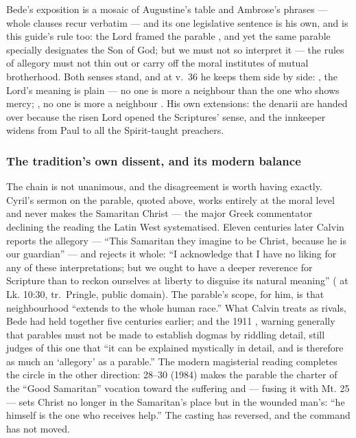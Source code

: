 \begin{witnessnote}
Bede's exposition is a mosaic of Augustine's table and Ambrose's phrases ---
whole clauses recur verbatim --- and its one legislative sentence is his own,
and is this guide's rule too: the Lord framed the parable , and yet the same parable
specially designates the Son of God; but we must not so interpret it
 --- the rules of allegory must not thin out or
carry off the moral institutes of mutual brotherhood. Both senses stand, and
at v.~36 he keeps them side by side: , the Lord's
meaning is plain --- no one is more a neighbour than the one who shows mercy;
, no one is more a neighbour . His own extensions: the denarii are handed over
 because the risen Lord opened the Scriptures' sense, and
the innkeeper widens from Paul to all the Spirit-taught preachers.
\end{witnessnote}

\subsubsection*{The tradition's own dissent, and its modern balance}

The chain is not unanimous, and the disagreement is worth having exactly.
Cyril's sermon on the parable, quoted above, works entirely at the moral
level and never makes the Samaritan Christ --- the major Greek commentator
declining the reading the Latin West systematised. Eleven centuries later
Calvin reports the allegory --- ``This Samaritan they imagine to be Christ,
because he is our guardian'' --- and rejects it whole: ``I acknowledge that I
have no liking for any of these interpretations; but we ought to have a
deeper reverence for Scripture than to reckon ourselves at liberty to
disguise its natural meaning'' ( at Lk.
10:30, tr.\ Pringle, public domain). The parable's scope, for him, is that
neighbourhood ``extends to the whole human race.'' What Calvin treats as
rivals, Bede had held together five centuries earlier; and the 1911
, warning generally that parables must not be
made to establish dogmas by riddling detail, still judges of this one that
``it can be explained mystically in detail, and is therefore as much an
`allegory' as a parable.'' The modern magisterial reading completes the
circle in the other direction:  28--30 (1984) makes
the parable the charter of the ``Good Samaritan'' vocation toward the
suffering and --- fusing it with Mt. 25 --- sets Christ no longer in the
Samaritan's place but in the wounded man's: ``he himself is the one who
receives help.'' The casting has reversed, and the command has not moved.

